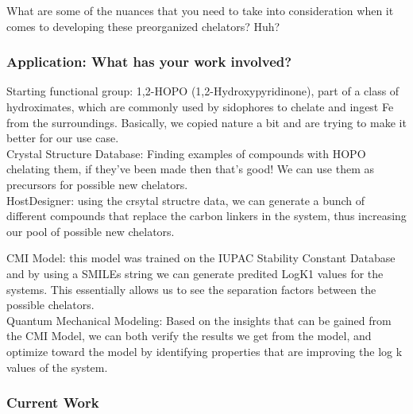 \begin{frame}
What are some of the nuances that you need to take into consideration when it comes to developing these preorganized chelators? Huh?
\end{frame}

\begin{frame}
\frametitle{Application: What has your work involved?}
Starting functional group: 1,2-HOPO (1,2-Hydroxypyridinone), part of a class of hydroximates, which are commonly used by sidophores to chelate and ingest Fe from the surroundings. Basically, we copied nature a bit and are trying to make
it better for our use case.\\
Crystal Structure Database: Finding examples of compounds with HOPO chelating them, if they've been made then that's good! We can use them as precursors for possible new chelators.\\
HostDesigner: using the crsytal structre data, we can generate a bunch of different compounds that replace the carbon linkers in the system, thus increasing our pool of possible new chelators.\\
\end{frame}
\begin{frame}
CMI Model: this model was trained on the IUPAC Stability Constant Database and by using a SMILEs string we can generate predited LogK1 values for the systems. This essentially allows us to see the separation factors between the possible chelators.\\
Quantum Mechanical Modeling: Based on the insights that can be gained from the CMI Model, we can both verify the results we get from the model, and optimize toward the model by identifying properties that are improving the log k values of the system.\\
\end{frame}


\begin{frame}
\frametitle{Current Work}
\end{frame}
